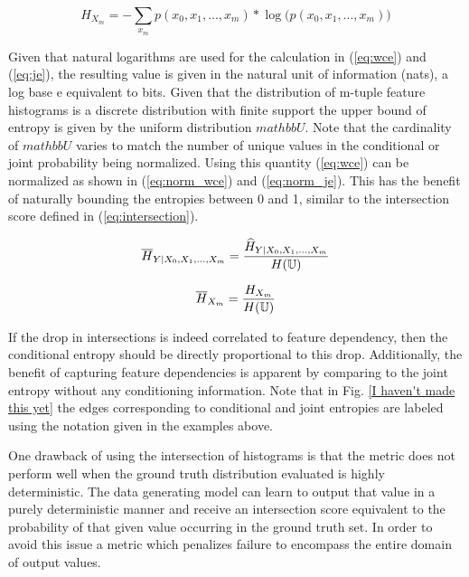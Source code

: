 \begin{equation}
\label{eq:je}
{H}_{X_m} = -\sum_{x_m} p(x_0, x_1,...,x_m)  * \log \big({{p(x_0,x_1,...,x_m)}}\big)
\end{equation}

Given that natural logarithms are used for the calculation in (\ref{eq:wce}) and (\ref{eq:je}), the resulting value is given in the natural unit of information (nats), a log base e equivalent to bits. Given that the distribution of m-tuple feature histograms is a discrete distribution with finite support the upper bound of entropy is given by the uniform distribution $mathbb{U}$. Note that the cardinality of $mathbb{U}$ varies to match the number of unique values in the conditional or joint probability being normalized. Using this quantity (\ref{eq:wce}) can be normalized as shown in (\ref{eq:norm_wce}) and (\ref{eq:norm_je}). This has the benefit of naturally bounding the entropies between 0 and 1, similar to the intersection score defined in (\ref{eq:intersection}).


\begin{equation}
\label{eq:norm_wce}
\overline{H}_{Y|X_0, X_1, ..., X_m} = {{\widehat{H}_{Y|X_0, X_1, ..., X_m}} \over{ H(\mathbb{U})}}
\end{equation}


\begin{equation}
\label{eq:norm_je}
\overline{H}_{X_m} = {{{H}_{X_m}} \over{ H(\mathbb{U})}}
\end{equation}

If the drop in intersections is indeed correlated to feature dependency, then the conditional entropy should be directly proportional to this drop. Additionally, the benefit of capturing feature dependencies is apparent by comparing to the joint entropy without any conditioning information. Note that in Fig. \ref{I haven't made this yet} the edges corresponding to conditional and joint entropies are labeled using the notation given in the examples above.

One drawback of using the intersection of histograms is that the metric does not perform well when the ground truth distribution evaluated is highly deterministic. The data generating model can learn to output that value in a purely deterministic manner and receive an intersection score equivalent to the probability of that given value occurring in the ground truth set. In order to avoid this issue a metric which penalizes failure to encompass the entire domain of output values. 

